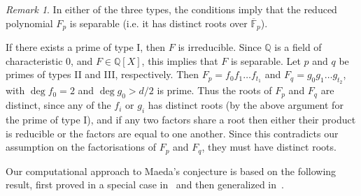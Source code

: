 \documentclass[11pt]{article}
\theoremstyle{plain}
\theoremstyle{definition}
\theoremstyle{remark}
\newtheorem{remark}[theorem]{Remark}
\numberwithin{equation}{section}
\newcommand{\FF}{\mathbb{F}}
\newcommand{\QQ}{\mathbb{Q}}
\begin{document}
\begin{remark}
In either of the three types, the conditions imply that the reduced polynomial
$F_p$ is separable (i.e. it has distinct roots over $\overline{\FF}_p$).

  If there exists a prime of type I, then $F$ is irreducible. Since $\QQ$ is a field of
  characteristic 0, and $F \in \QQ[X]$, this implies that $F$ is separable. Let $p$ and 
  $q$ be primes of types II and III, respectively. Then $F_p = f_0 f_1 \ldots f_{t_1}$
  and $F_q = g_0 g_1 \ldots g_{t_2}$, with $\deg f_0 = 2$ and $\deg g_0 > d/2$ is prime.
  Thus the roots of $F_p$ and $F_q$ are distinct, since any of the $f_i$ or $g_i$ has
  distinct roots (by the above argument for the prime of type I), and if any two factors
  share a root then either their product is reducible or the factors are equal to one
  another. Since this contradicts our assumption on the factorisations of $F_p$ and
  $F_q$, they must have distinct roots.
\end{remark}

Our computational approach to Maeda's conjecture is based on the following
result, first proved in a special case in~\cite{Buzzard} and then generalized
in~\cite{ConreyFarmer}.
\end{document}
